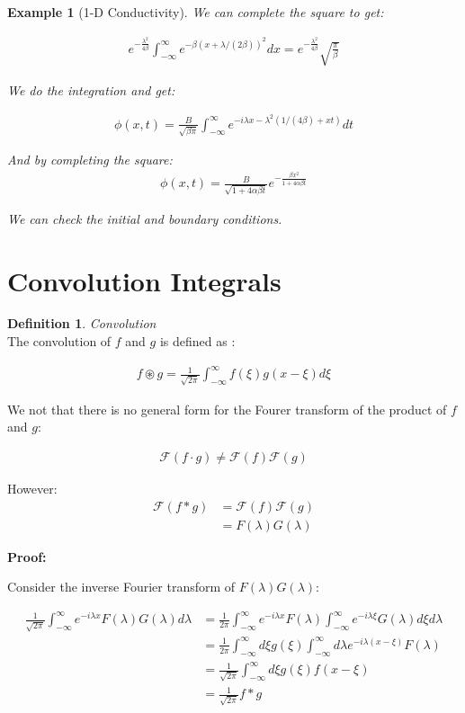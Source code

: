 \documentclass{article}
\newtheorem{ex}{Example}
\theoremstyle{definition}
\newtheorem{definition}{Definition}[section]
\newcommand{\Def}[2]{
\begin{shaded*}
\begin{definition}{\textit{#1}}\\#2\end{definition}
\end{shaded*}
}
\def\F{\mathcal{F}}
\def\conv{\circledast}
\begin{document}
\begin{ex}[1-D Conductivity]
We can complete the square to get:

\begin{align*}
e^{-\frac{\lambda^2}{4\beta}} \int_{-\infty}^\infty e^{-\beta (x + \lambda / (2\beta))^2} dx = e^{-\frac{\lambda^2}{4\beta}} \sqrt{\frac{\pi}{\beta}}
\end{align*}

We do the integration and get:

\begin{align*}
\phi(x,t) = \frac{B}{\sqrt{\beta \pi}} \int_{-\infty}^\infty e^{- i \lambda x-\lambda^2 (1/(4\beta) + x t)} dt 
\end{align*}

And by completing the square: 
\begin{align*}
\phi(x,t) = \frac{B}{\sqrt{1 + 4 \alpha \beta t}} e^{-\frac{\beta x^2}{1 + 4 \alpha \beta t}}
\end{align*}

We can check the initial and boundary conditions.

\end{ex}


\section{Convolution Integrals}

\Def{Convolution}{
The convolution of $f$ and $g$ is defined as :

\begin{align*}
f \conv g = \frac{1}{\sqrt{2 \pi}} \int_{-\infty}^{\infty} f(\xi) g(x - \xi) d\xi
\end{align*}

}

We not that there is no general form for the Fourer transform of the product of $f$ and $g$:

\begin{align*}
\F (f \cdot g) \neq \F (f) \F (g)
\end{align*}

However:
\begin{align}
\F (f * g) &= \F(f) \F (g) \\ 
& = F(\lambda ) G(\lambda)
\end{align}

\textbf{Proof:}

Consider the inverse Fourier transform of $F(\lambda ) G(\lambda)$:

\begin{align*}
\frac{1}{\sqrt{2 \pi}} \int_{-\infty}^{\infty} e^{- i \lambda x}F(\lambda ) G(\lambda) d\lambda  &= \frac{1}{2 \pi} \int_{-\infty}^{\infty} e^{- i \lambda x}F(\lambda ) \int_{-\infty}^{\infty} e^{- i \lambda \xi}G(\lambda ) d\xi d\lambda  \\ 
& = \frac{1}{2 \pi} \int_{-\infty}^{\infty} d \xi g(\xi) \int_{-\infty}^{\infty} d\lambda e^{- i \lambda (x-\xi)}F(\lambda ) \\ 
& = \frac{1}{\sqrt{2 \pi}} \int_{-\infty}^{\infty} d \xi g(\xi) f(x-\xi) \\
& = \frac{1}{\sqrt{2 \pi}} f * g 
\end{align*}
\end{document}
